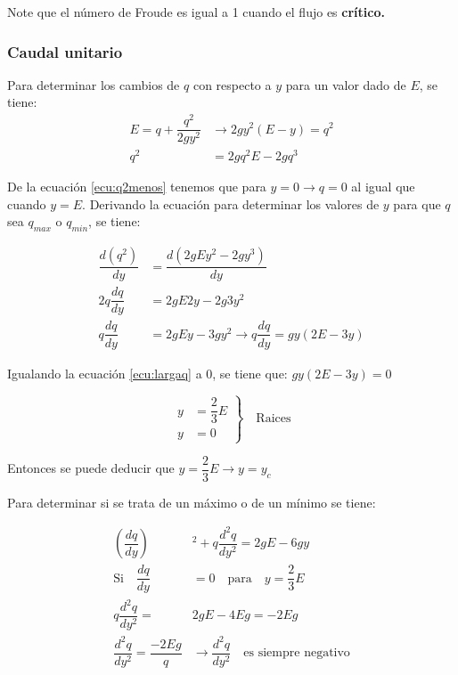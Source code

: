 \documentclass[11pt, oneside]{article}
\begin{document}
Note que el número de Froude es igual a 1 cuando el flujo es \textbf{crítico.}

\subsubsection{Caudal unitario}

Para determinar los cambios de $q$ con respecto a $y$ para un valor dado de $E$, se tiene:
\begin{equation}
    \begin{aligned}
      E=q+\dfrac{q^{2}}{2gy^{2}}&\rightarrow2gy^{2}(E-y)=q^{2} \\
      q^{2}&=2gq^{2}E-2gq^{3}
    \end{aligned}
    \label{ecu:q2menos}
\end{equation}
 
De la ecuación \ref{ecu:q2menos} tenemos que para $y=0\rightarrow q=0$ al igual que cuando $y=E$. Derivando la ecuación para determinar los valores de $y$ para que $q$ sea $q_{max}$ o $q_{min}$, se tiene:

\begin{equation}
    \begin{aligned}
        \dfrac{d(q^{2})}{dy}&=\dfrac{d(2gEy^{2}-2gy^{3})}{dy} \\
        2q \dfrac{dq}{dy}&=2gE2y-2g3y^{2}\\
        q \dfrac{dq}{dy}&=2gEy-3gy^{2} \rightarrow q \dfrac{dq}{dy}=gy(2E-3y)
    \end{aligned}
    \label{ecu:largaq}
\end{equation}

Igualando la ecuación \ref{ecu:largaq} a 0, se tiene que: $gy(2E-3y)=0$

\begin{equation} 
    \left.\begin{aligned} y&=\dfrac{2}{3}E \\
    y&=0\end{aligned} \right \} \quad \text{Raices} 
\end{equation}

Entonces se puede deducir que $y=\dfrac{2}{3}E\rightarrow y=y_{c}$ \vspace{2ex}

Para determinar si se trata de un máximo o de un mínimo se tiene:

\begin{equation}
    \begin{aligned}
        \left(\dfrac{dq}{dy}\right)&^{2}+q\dfrac{d^{2}q}{dy^{2}}=2gE-6gy \\
        \text{Si} \quad \dfrac{dq}{dy}&=0 \quad \text{para} \quad y=\dfrac{2}{3}E \\
        q\dfrac{d^{2}q}{dy^{2}}=&2gE-4Eg=-2Eg\\
        \dfrac{d^{2}q}{dy^{2}}=\dfrac{-2Eg}{q}&\rightarrow\dfrac{d^{2}q}{dy^{2}} \quad \text{es siempre negativo}
    \end{aligned}
\end{equation}
\end{document}
